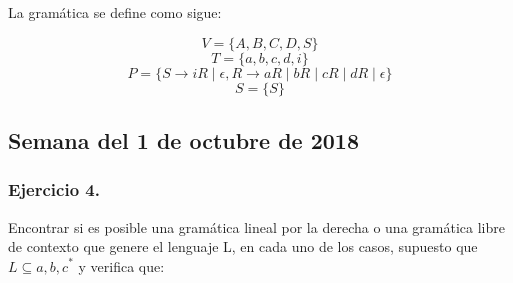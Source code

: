 \documentclass[11pt,a4paper]{article}
\begin{document}
La gramática se define como sigue:

\[V=\{A,B,C,D,S\}\]
\[T=\{a,b,c,d,i\}\]
\[P=\{S\rightarrow iR\mid \epsilon,R\rightarrow aR\mid bR\mid cR\mid dR\mid \epsilon\}\]
\[S=\{S\}\]

\subsection{Semana del 1 de octubre de 2018}

\subsubsection{Ejercicio 4.} Encontrar si es posible una gramática lineal por la derecha o una gramática libre de contexto que genere el lenguaje L, en cada uno de los casos, supuesto que $L\subseteq {a,b,c}^{*}$ y verifica que:
\end{document}
